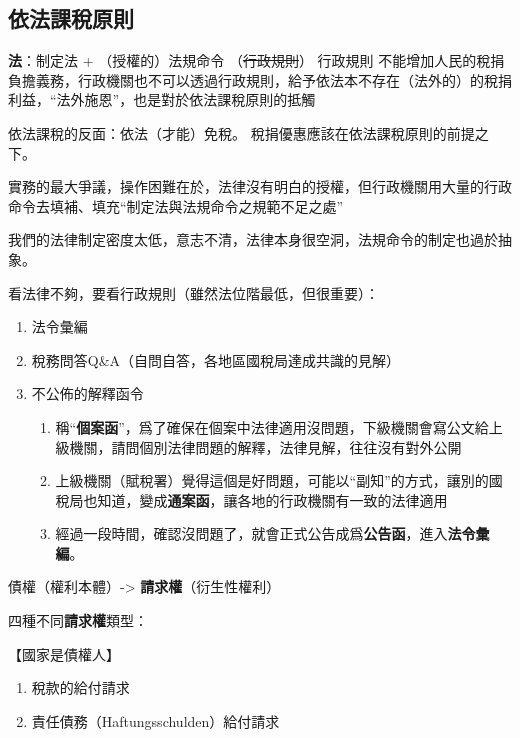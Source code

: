 \documentclass[]{ctexbook}
\providecommand{\tightlist}{%
  \setlength{\itemsep}{0pt}\setlength{\parskip}{0pt}}
\begin{document}
\hypertarget{ux4f9dux6cd5ux8ab2ux7a05ux539fux5247}{%
\subsection{依法課稅原則}\label{ux4f9dux6cd5ux8ab2ux7a05ux539fux5247}}

\textbf{法}：制定法 + （授權的）法規命令 （\sout{行政規則}）
行政規則 不能增加人民的稅捐負擔義務，行政機關也不可以透過行政規則，給予依法本不存在（法外的）的稅捐利益，``法外施恩''，也是對於依法課稅原則的抵觸

依法課稅的反面：依法（才能）免稅。
稅捐優惠應該在依法課稅原則的前提之下。

實務的最大爭議，操作困難在於，法律沒有明白的授權，但行政機關用大量的行政命令去填補、填充``制定法與法規命令之規範不足之處''

我們的法律制定密度太低，意志不清，法律本身很空洞，法規命令的制定也過於抽象。

看法律不夠，要看行政規則（雖然法位階最低，但很重要）：

\begin{enumerate}
\def\labelenumi{\arabic{enumi}.}
\tightlist
\item
  法令彙編
\item
  稅務問答Q\&A（自問自答，各地區國稅局達成共識的見解）
\item
  不公佈的解釋函令

  \begin{enumerate}
  \def\labelenumii{\arabic{enumii}.}
  \tightlist
  \item
    稱``\textbf{個案函}''，爲了確保在個案中法律適用沒問題，下級機關會寫公文給上級機關，請問個別法律問題的解釋，法律見解，往往沒有對外公開
  \item
    上級機關（賦稅署）覺得這個是好問題，可能以``副知''的方式，讓別的國稅局也知道，變成\textbf{通案函}，讓各地的行政機關有一致的法律適用
  \item
    經過一段時間，確認沒問題了，就會正式公告成爲\textbf{公告函}，進入\textbf{法令彙編}。
  \end{enumerate}
\end{enumerate}

債權（權利本體）-\textgreater{} \textbf{請求權}（衍生性權利）

四種不同\textbf{請求權}類型：

【國家是債權人】

\begin{enumerate}
\def\labelenumi{\arabic{enumi}.}
\tightlist
\item
  稅款的給付請求
\item
  責任債務（Haftungsschulden）給付請求
\end{enumerate}
\end{document}
